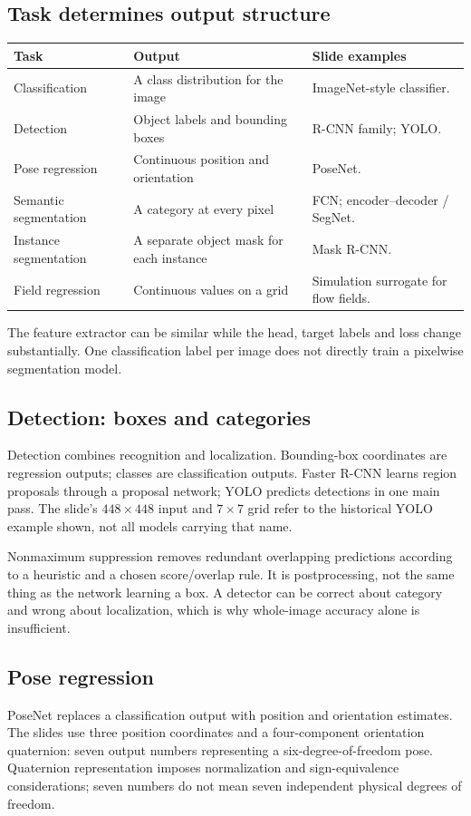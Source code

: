 \documentclass[11pt]{article}
\begin{document}
\subsection{Task determines output structure}
\begin{longtable}{@{}P{.25\textwidth}P{.33\textwidth}P{.33\textwidth}@{}}
\toprule Task & Output & Slide examples\\\midrule\endhead
Classification & A class distribution for the image & ImageNet-style classifier.\\
Detection & Object labels and bounding boxes & R-CNN family; YOLO.\\
Pose regression & Continuous position and orientation & PoseNet.\\
Semantic segmentation & A category at every pixel & FCN; encoder--decoder / SegNet.\\
Instance segmentation & A separate object mask for each instance & Mask R-CNN.\\
Field regression & Continuous values on a grid & Simulation surrogate for flow fields.\\\bottomrule
\end{longtable}
The feature extractor can be similar while the head, target labels and loss change substantially. One classification label per image does not directly train a pixelwise segmentation model.
\subsection{Detection: boxes and categories}
Detection combines recognition and localization. Bounding-box coordinates are regression outputs; classes are classification outputs. Faster R-CNN learns region proposals through a proposal network; YOLO predicts detections in one main pass. The slide's $448\times448$ input and $7\times7$ grid refer to the historical YOLO example shown, not all models carrying that name.

Nonmaximum suppression removes redundant overlapping predictions according to a heuristic and a chosen score/overlap rule. It is postprocessing, not the same thing as the network learning a box. A detector can be correct about category and wrong about localization, which is why whole-image accuracy alone is insufficient.
\subsection{Pose regression}
PoseNet replaces a classification output with position and orientation estimates. The slides use three position coordinates and a four-component orientation quaternion: seven output numbers representing a six-degree-of-freedom pose. Quaternion representation imposes normalization and sign-equivalence considerations; seven numbers do not mean seven independent physical degrees of freedom.
\end{document}
